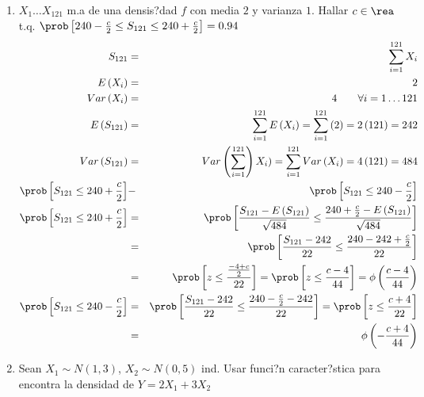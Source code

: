 \begin{enumerate}
\item $X_{1} \ldots X_{121}$ m.a de una densis?dad $f$ con media $2$ y varianza $1$. Hallar $c \in \rea$ t.q.
$\prob \left[240- \frac{c}{2} \leq S_{121} \leq 240 + \frac{c}{2} \right]= 0.94$
 \begin{eqnarray*}
 S_{121} &=& \sum_{i=1}^{121} X_{i}\\
 E \left(X_{i} \right)&=& 2\\
  Var \left(X_{i} \right)&=& 4 \, \, \, \, \, \, \, \, \, \, \, \, \forall i=1 \ldots 121 \\
  E \left(S_{121} \right)&=& \sum_{i=1}^{121} E \left(X_{i}\right) = \sum_{i=1}^{121} \left(2 \right)= 2 \left(121 \right)= 242\\
  Var \left( S_{121} \right)&=& Var \left( \sum_{i=1}^{121} \right) X_{i})= \sum_{i=1}^{121} Var \left(X_{i} \right)= 4 \left(121 \right)= 484\\
\prob \left[S_{121} \leq 240 + \frac{c}{2} \right]&-& \prob \left[S_{121} \leq 240-\frac{c}{2} \right]\\
\prob \left[S_{121} \leq 240 + \frac{c}{2} \right]&=& \prob \left[  \dfrac{S_{121}-E \left( S_{121} \right) }{ \sqrt{484} } \leq \dfrac{240 + \frac{c}{2}- E \left(S_{121} \right)}{\sqrt{484}  }\right]\\
&=& \prob \left[ \dfrac{S_{121}- 242}{22} \leq \dfrac{240 - 242 + \frac{c}{2} }{22} \right]\\
&=& \prob \left[z \leq \frac{ \frac{-4+c}{2} }{22} \right] = \prob \left[ z \leq \frac{c-4}{44} \right] = \phi \left( \frac{c-4}{44} \right)\\
\prob \left[S_{121} \leq 240-\frac{c}{2} \right] &=& \prob \left[ \dfrac{S_{121} - 242 }{22} \leq \dfrac{240 - \frac{c}{2}-242 }{22} \right] = \prob \left[z \leq \frac{c+4}{22} \right]\\
&=& \phi \left(- \frac{c+4}{44} \right)
 \end{eqnarray*}
 \item Sean $X_{1} \sim N \left( 1,3 \right) $, $X_{2} \sim N \left( 0,5 \right) $ ind. Usar funci?n caracter?stica para encontra la densidad de $Y=2X_{1}+3X_{2}$
 

\end{enumerate}

